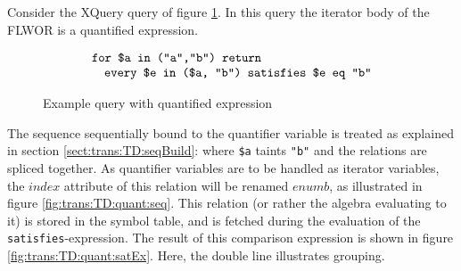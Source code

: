 \begin{myExample}
Consider the XQuery query of figure \ref{fig:trans:TD:quantQu}. In this query the iterator body of the FLWOR is a
quantified expression.
\begin{figure}[h]
\begin{equation*}
\begin{array}{l}
\mbox{\texttt{for \$a in ("a","b") return}} \\ \quad
\mbox{\texttt{every \$e in (\$a, "b") satisfies \$e eq "b"}}
\end{array}
\end{equation*}
\caption{Example query with quantified expression \label{fig:trans:TD:quantQu}}
\end{figure}

The sequence sequentially bound to the quantifier variable is treated as explained in section
\ref{sect:trans:TD:seqBuild}: where \texttt{\$a} taints \texttt{"b"} and the relations are spliced together. As
quantifier variables are to be handled as iterator variables, the $index$ attribute of this relation will be
renamed $enumb$, as illustrated in figure \ref{fig:trans:TD:quant:seq}. This relation (or rather the algebra
evaluating to it) is stored in the symbol table, and is fetched during the evaluation of the
\texttt{satisfies}-expression. The result of this comparison expression is shown in figure
\ref{fig:trans:TD:quant:satEx}. Here, the double line illustrates grouping.

\begin{figure}[h]
\centering
{}
\qquad
{}
\qquad
{}


\end{figure}
\end{myExample}
